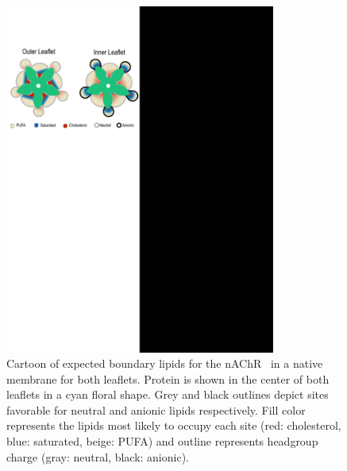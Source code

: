 \documentclass[%
 aip,
 amsmath,amssymb,
 preprint,%
]{revtex4-1}\usepackage{setspace}
\newcommand{\nachr}{nAChR}
\begin{document}
\begin{figure}
	\center
	\includegraphics[width=3.5in]{Summary.pdf}
	\caption{{Cartoon of expected boundary lipids for the \nachr~ in a native membrane for both leaflets}. Protein is shown in the center of both leaflets in a cyan floral shape. Grey and black outlines depict sites favorable for neutral and anionic lipids respectively. Fill color represents the lipids most likely to occupy each site (red: cholesterol, blue: saturated, beige: PUFA) and outline represents headgroup charge (gray: neutral, black: anionic).}
	\label{fig:sum}
\end{figure}
\end{document}
